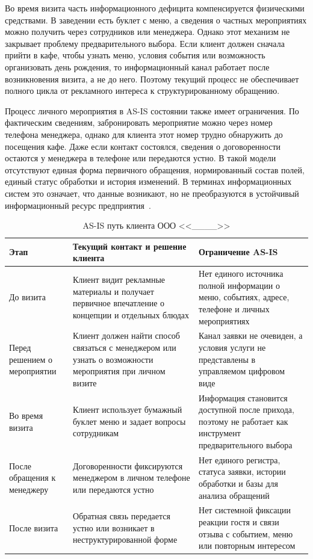 Во время визита часть информационного дефицита компенсируется физическими средствами. В заведении есть буклет с меню, а сведения о частных мероприятиях можно получить через сотрудников или менеджера. Однако этот механизм не закрывает проблему предварительного выбора. Если клиент должен сначала прийти в кафе, чтобы узнать меню, условия события или возможность организовать день рождения, то информационный канал работает после возникновения визита, а не до него. Поэтому текущий процесс не обеспечивает полного цикла от рекламного интереса к структурированному обращению.

Процесс личного мероприятия в AS-IS состоянии также имеет ограничения. По фактическим сведениям, забронировать мероприятие можно через номер телефона менеджера, однако для клиента этот номер трудно обнаружить до посещения кафе. Даже если контакт состоялся, сведения о договоренности остаются у менеджера в телефоне или передаются устно. В такой модели отсутствуют единая форма первичного обращения, нормированный состав полей, единый статус обработки и история изменений. В терминах информационных систем это означает, что данные возникают, но не преобразуются в устойчивый информационный ресурс предприятия~\cite{utkin_baldin_2003,gost34003}.

\begin{table}[H]
\centering
\small
\caption{AS-IS путь клиента ООО <<\_\_\_\_>>}
\label{tab:ch2_asis_customer_journey}
\begin{tabularx}{\textwidth}{|>{\raggedright\arraybackslash}p{}|>{\raggedright\arraybackslash}p{}|>{\raggedright\arraybackslash}X|}
\hline
\textbf{Этап} & \textbf{Текущий контакт и решение клиента} & \textbf{Ограничение AS-IS} \\ \hline
До визита & Клиент видит рекламные материалы и получает первичное впечатление о концепции и отдельных блюдах & Нет единого источника полной информации о меню, событиях, адресе, телефоне и личных мероприятиях \\ \hline
Перед решением о мероприятии & Клиент должен найти способ связаться с менеджером или узнать о возможности мероприятия при личном визите & Канал заявки не очевиден, а условия услуги не представлены в управляемом цифровом виде \\ \hline
Во время визита & Клиент использует бумажный буклет меню и задает вопросы сотрудникам & Информация становится доступной после прихода, поэтому не работает как инструмент предварительного выбора \\ \hline
После обращения к менеджеру & Договоренности фиксируются менеджером в личном телефоне или передаются устно & Нет единого регистра, статуса заявки, истории обработки и базы для анализа обращений \\ \hline
После визита & Обратная связь передается устно или возникает в неструктурированной форме & Нет системной фиксации реакции гостя и связи отзыва с событием, меню или повторным интересом \\ \hline
\end{tabularx}
\normalsize
\end{table}

